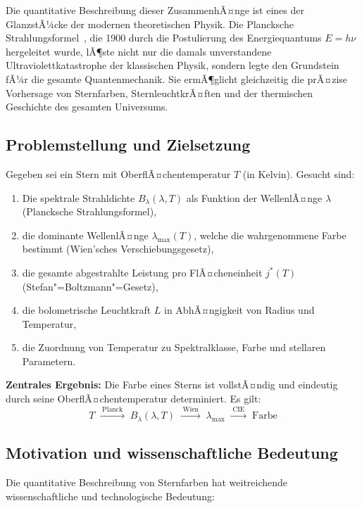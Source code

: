 ﻿\documentclass[a4paper,12pt]{article}
\theoremstyle{definition}
\begin{document}
Die quantitative Beschreibung dieser ZusammenhÃ¤nge ist eines der GlanzstÃ¼cke der
modernen theoretischen Physik. Die Plancksche Strahlungsformel~\cite{planck1900},
die 1900 durch die Postulierung des Energiequantums $E = h\nu$ hergeleitet wurde, lÃ¶ste
nicht nur die damals unverstandene Ultraviolettkatastrophe der klassischen Physik,
sondern legte den Grundstein fÃ¼r die gesamte Quantenmechanik. Sie ermÃ¶glicht gleichzeitig
die prÃ¤zise Vorhersage von Sternfarben, SternleuchtkrÃ¤ften und der thermischen Geschichte
des gesamten Universums.

\subsection{Problemstellung und Zielsetzung}

Gegeben sei ein Stern mit OberflÃ¤chentemperatur $T$ (in Kelvin). Gesucht sind:
\begin{enumerate}
    \item Die spektrale Strahldichte $B_\lambda(\lambda, T)$ als Funktion der WellenlÃ¤nge $\lambda$
          (Plancksche Strahlungsformel),
    \item die dominante WellenlÃ¤nge $\lambda_{\max}(T)$, welche die wahrgenommene Farbe bestimmt
          (Wien'sches Verschiebungsgesetz),
    \item die gesamte abgestrahlte Leistung pro FlÃ¤cheneinheit $j^*(T)$
          (Stefan"=Boltzmann"=Gesetz),
    \item die bolometrische Leuchtkraft $L$ in AbhÃ¤ngigkeit von Radius und Temperatur,
    \item die Zuordnung von Temperatur zu Spektralklasse, Farbe und stellaren Parametern.
\end{enumerate}

\textbf{Zentrales Ergebnis:} Die Farbe eines Sterns ist vollstÃ¤ndig und eindeutig
durch seine OberflÃ¤chentemperatur determiniert. Es gilt:
\[
    T \;\xrightarrow{\;\text{Planck}\;}\; B_\lambda(\lambda,T)
    \;\xrightarrow{\;\text{Wien}\;}\; \lambda_{\max}
    \;\xrightarrow{\;\text{CIE}\;}\; \text{Farbe}
\]

\subsection{Motivation und wissenschaftliche Bedeutung}

Die quantitative Beschreibung von Sternfarben hat weitreichende wissenschaftliche
und technologische Bedeutung:
\end{document}
